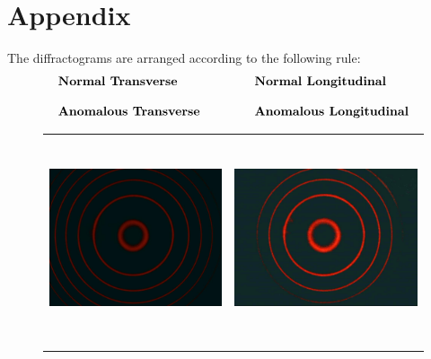 \documentclass[a4paper,12pt,abstracton]{scrartcl}
\begin{document}
\section{Appendix}\label{appendix}
The diffractograms are arranged according to the following rule: 
$$
\begin{tabular}{l l}
\textbf{Normal Transverse} &\hspace{1cm} \textbf{Normal Longitudinal} \\ \\ 
\textbf{Anomalous Transverse}  &\hspace{1cm} \textbf{Anomalous Longitudinal} 
\end{tabular}
$$

\begin{figure}[H]
    \centering
    \begin{tabular}{c c}
      \includegraphics[height=6cm,keepaspectratio]{images/z0.png} & \includegraphics[height=6cm,keepaspectratio]{images/zl0.png} \\\\

\end{tabular}
\end{figure}
\end{document}
